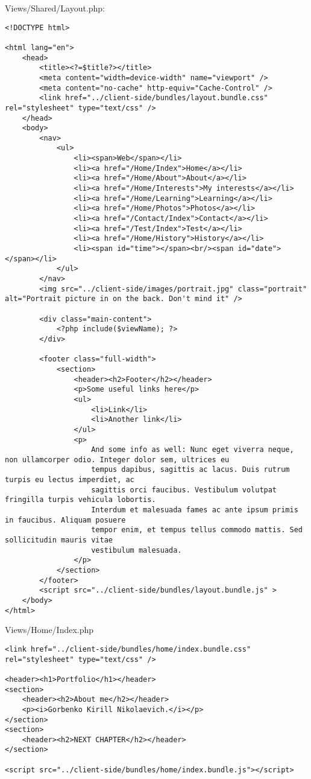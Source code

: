 \documentclass[a4paper,14pt]{extarticle}
\begin{document}
Views/Shared/Layout.php:
\begin{lstlisting}
<!DOCTYPE html>

<html lang="en">
    <head>
        <title><?=$title?></title>
        <meta content="width=device-width" name="viewport" />
        <meta content="no-cache" http-equiv="Cache-Control" />
        <link href="../client-side/bundles/layout.bundle.css" rel="stylesheet" type="text/css" />
    </head>
    <body>
        <nav>
            <ul>
                <li><span>Web</span></li>
                <li><a href="/Home/Index">Home</a></li>
                <li><a href="/Home/About">About</a></li>
                <li><a href="/Home/Interests">My interests</a></li>
                <li><a href="/Home/Learning">Learning</a></li>
                <li><a href="/Home/Photos">Photos</a></li>
                <li><a href="/Contact/Index">Contact</a></li>
                <li><a href="/Test/Index">Test</a></li>
                <li><a href="/Home/History">History</a></li>
                <li><span id="time"></span><br/><span id="date"></span></li>
            </ul>
        </nav>
        <img src="../client-side/images/portrait.jpg" class="portrait" alt="Portrait picture in on the back. Don't mind it" />

        <div class="main-content">
            <?php include($viewName); ?>
        </div>

        <footer class="full-width">
            <section>
                <header><h2>Footer</h2></header>
                <p>Some useful links here</p>
                <ul>
                    <li>Link</li>
                    <li>Another link</li>
                </ul>
                <p>
                    And some info as well: Nunc eget viverra neque, non ullamcorper odio. Integer dolor sem, ultrices eu
                    tempus dapibus, sagittis ac lacus. Duis rutrum turpis eu lectus imperdiet, ac
                    sagittis orci faucibus. Vestibulum volutpat fringilla turpis vehicula lobortis.
                    Interdum et malesuada fames ac ante ipsum primis in faucibus. Aliquam posuere
                    tempor enim, et tempus tellus commodo mattis. Sed sollicitudin mauris vitae
                    vestibulum malesuada.
                </p>
            </section>
        </footer>
        <script src="../client-side/bundles/layout.bundle.js" >
    </body>
</html>
\end{lstlisting}

Views/Home/Index.php
\begin{lstlisting}
<link href="../client-side/bundles/home/index.bundle.css" rel="stylesheet" type="text/css" />

<header><h1>Portfolio</h1></header>
<section>
    <header><h2>About me</h2></header>
    <p><i>Gorbenko Kirill Nikolaevich.</i></p>
</section>
<section>
    <header><h2>NEXT CHAPTER</h2></header>
</section>

<script src="../client-side/bundles/home/index.bundle.js"></script>
\end{lstlisting}
\end{document}
